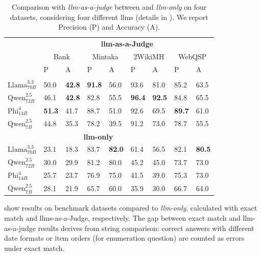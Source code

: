 \begin{table}[htbp]
\caption[Comparison with \textit{\ac{llm}-as-a-judge} between  and \textit{\ac{llm}-only}.]{Comparison with \textit{\ac{llm}-as-a-judge} between  and \textit{\ac{llm}-only} on four datasets, considering four different \acp{llm} (details in ). We report Precision (P) and Accuracy (A). }
\label{tab:judge_results_memorization}
\centering
\begin{tabular}{lll|ll|ll|ll}
\toprule
 & \multicolumn{8}{c}{\textbf{\ac{llm}-as-a-Judge}} \\
 & \multicolumn{2}{c|}{Bank} & \multicolumn{2}{c|}{Mintaka} & \multicolumn{2}{c|}{2WikiMH} & \multicolumn{2}{c}{WebQSP}  \\
 & P & A & P & A & P & A & P & A \\
\midrule
\multicolumn{8}{c}{\textbf{}} \\
$\text{Llama}^{3.3}_{70B}$  &  50.0 & \textbf{42.8} & \textbf{91.8} & 56.0 & 93.6 & 81.0 & 85.2 & 63.5 \\
$\text{Qwen}^{2.5}_{72B}$  &  46.1 & \textbf{42.8} & 82.8 & 55.5 & \textbf{96.4} & \textbf{92.5} & 84.8 & 65.5 \\
$\text{Phi}^{4}_{14B}$  &  \textbf{51.3} & 41.7 & 88.7 & 51.0 & 92.6 & 69.5 & \textbf{89.7} & 61.0 \\
$\text{Qwen}^{2.5}_{7B}$  &  44.8 & 35.3 & 78.2 & 39.5 & 91.2 & 73.0 & 78.7 & 55.5 \\
\midrule
\multicolumn{8}{c}{\textbf{\acs{llm}-only}} \\
$\text{Llama}^{3.3}_{70B}$  &  23.1 & 18.3 & 83.7 & \textbf{82.0 }& 61.4 & 56.5 & 82.1 & \textbf{80.5} \\
$\text{Qwen}^{2.5}_{72B}$  &  30.0 & 29.9 & 81.2 & 80.0 & 45.2 & 45.0 & 73.7 & 73.0 \\
$\text{Phi}^{4}_{14B}$  &  25.7 & 23.7 & 76.9 & 75.0 & 41.5 & 39.0 & 75.3 & 73.0 \\
$\text{Qwen}^{2.5}_{7B}$  &  28.1 & 21.9 & 65.7 & 60.0 & 35.9 & 30.0 & 66.7 & 64.0 \\
\bottomrule
\end{tabular}
\end{table}





 show  results on benchmark datasets compared to \textit{\ac{llm}-only}, calculated with exact match and \acp{llm}-as-a-Judge, respectively. The gap between exact match and \ac{llm}-as-a-judge results derives from string comparison: correct answers with different date formats or item orders (for enumeration question) are counted as errors under exact match.%

